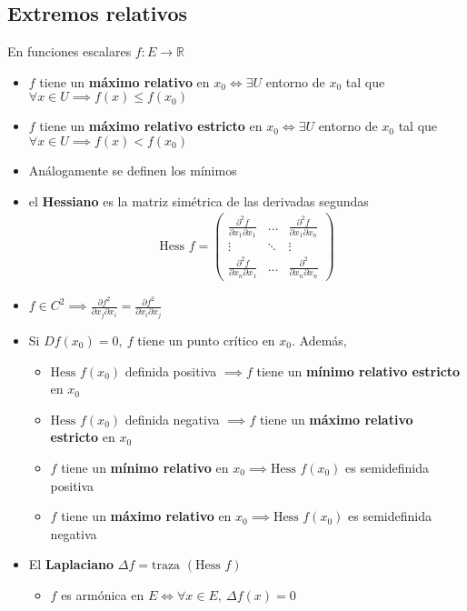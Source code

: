 \documentclass[a4paper,twocolumn]{extarticle}
\newcommand{\R}{\mathbb{R}}
\newcommand{\hess}{\text{Hess }}
\newcommand{\tr}{\text{traza }}
\begin{document}
\subsection{Extremos relativos}
En funciones escalares $f:E \to \R$
\begin{itemize}
	\item $f$ tiene un \textbf{máximo relativo} en $x_0 \iff \exists U$ entorno de $x_0$ tal que $\forall x \in U \implies f(x) \leq f(x_0)$
	\item $f$ tiene un \textbf{máximo relativo estricto} en $x_0 \iff \exists U$ entorno de $x_0$ tal que $\forall x \in U \implies f(x) < f(x_0)$
	\item Análogamente se definen los mínimos
	\item  el \textbf{Hessiano} es la matriz simétrica de las derivadas segundas
	\begin{align*}
		\hess f = \left(\begin{array}{ccc}
		\frac{\partial^2f}{\partial x_1\partial x_1} & \dots & \frac{\partial^2 f}{\partial x_1 \partial x_n} \\
		\vdots & \ddots & \vdots \\
		\frac{\partial^2f}{\partial x_n \partial x_1} & \dots & \frac{\partial^2}{\partial x_n \partial x_n}
		\end{array}\right)
	\end{align*}
	\item $f \in C^2 \implies \frac{\partial f^2}{\partial x_j\partial x_i} = \frac{\partial f^2}{\partial x_i \partial x_j}$
	\item Si $Df(x_0) = 0,\ f$ tiene un punto crítico en $x_0$. Además,
	\begin{itemize}
		\item $\hess f(x_0)$ definida positiva $\implies f$ tiene un \textbf{mínimo relativo estricto} en $x_0$
		\item $\hess f(x_0)$ definida negativa $\implies f$ tiene un \textbf{máximo relativo estricto} en $x_0$
		\item $f$ tiene un \textbf{mínimo relativo} en $x_0 \implies \hess f(x_0)$ es semidefinida positiva
		\item $f$ tiene un \textbf{máximo relativo} en $x_0 \implies \hess f(x_0)$ es semidefinida negativa
	\end{itemize}
	\item El \textbf{Laplaciano} $\Delta f = \tr (\hess f)$
	\begin{itemize}
		\item $f$ es armónica en $E \iff \forall x \in E,\ \Delta f(x) = 0$

\end{itemize}
\end{itemize}
\end{document}
